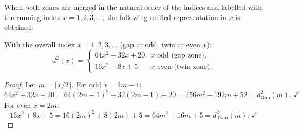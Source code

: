 When both zones are merged in the natural order of the indices and labelled
with the running index $x = 1, 2, 3, \ldots$, the following unified
representation in $x$ is obtained:

\begin{theorem}
\label{satz:distanz_gesamtindex}
With the overall index $x = 1, 2, 3, \ldots$ (gap at odd, twin at
even $x$):
\begin{equation}
  d^2(x) =
  \begin{cases}
    64x^2 + 32x + 20 & x \text{ odd (gap zone)}, \\[4pt]
    16x^2 + 8x + 5   & x \text{ even (twin zone)}.
  \end{cases}
\end{equation}
\end{theorem}

\begin{proof}
Let $m = \lceil x/2 \rceil$. For odd $x = 2m-1$:
\[
  64x^2+32x+20
  = 64(2m-1)^2+32(2m-1)+20
  = 256m^2-192m+52
  = d_{\mathrm{Gap}}^2(m). \;\checkmark
\]
For even $x = 2m$:
\[
  16x^2+8x+5
  = 16(2m)^2+8(2m)+5
  = 64m^2+16m+5
  = d_{\mathrm{Twin}}^2(m). \;\checkmark
\]
\end{proof}

